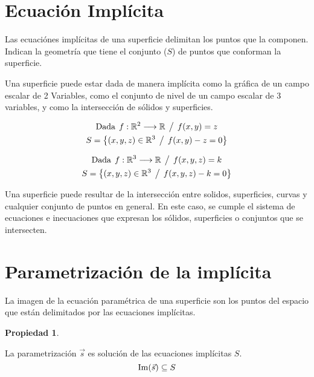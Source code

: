 \documentclass[a5paper,12pt,twoside]{book}
\newtheorem{prop}{{Propiedad}}[chapter]
\begin{document}
\section{Ecuación Implícita}

Las ecuaciónes implícitas de una superficie delimitan los puntos que la componen. Indican la geometría que tiene el conjunto ($S$) de puntos que conforman la superficie.

Una superficie puede estar dada de manera implícita como la gráfica de un campo escalar de 2 Variables, como el conjunto de nivel de un campo escalar de 3 variables, y como la intersección de sólidos y superficies.

\begin{gather*}
    \textrm{Dada} \hspace{1ex} f:\mathbb{R}^2 \longrightarrow \mathbb{R} \hspace{1ex} \big/ \hspace{1ex} f(x,y)=z
    \\
    S= { \left\{ { (x,y,z) \in \mathbb{R}^3 \hspace{1ex} \big/ \hspace{1ex} f(x,y)-z=0 } \right\} }
\end{gather*}

\begin{gather*}
    \textrm{Dada} \hspace{1ex}  f:\mathbb{R}^3 \longrightarrow \mathbb{R} \hspace{1ex} \big/ \hspace{1ex} f(x,y,z)=k
    \\
    S= { \left\{ { (x,y,z) \in \mathbb{R}^3 \hspace{1ex} \big/ \hspace{1ex} f(x,y,z)-k=0 } \right\} }
\end{gather*}


Una superficie puede resultar de la intersección entre solidos, superficies, curvas y cualquier conjunto de puntos en general. En este caso, se cumple el sistema de ecuaciones e inecuaciones que expresan los sólidos, superficies o conjuntos que se intersecten.


\section{Parametrización de la implícita}

La imagen de la ecuación paramétrica de una superficie son los puntos del espacio que están delimitados por las ecuaciones implícitas.

\begin{mdframed}[style=MyFrame1]
    \begin{prop}
    \end{prop}
    La parametrización $\Vec{s}$ es solución de las ecuaciones implícitas $S$.
    \begin{equation*}
        \operatorname{Im} (\Vec{s}) \subseteq S
    \end{equation*}
\end{mdframed}
\end{document}
